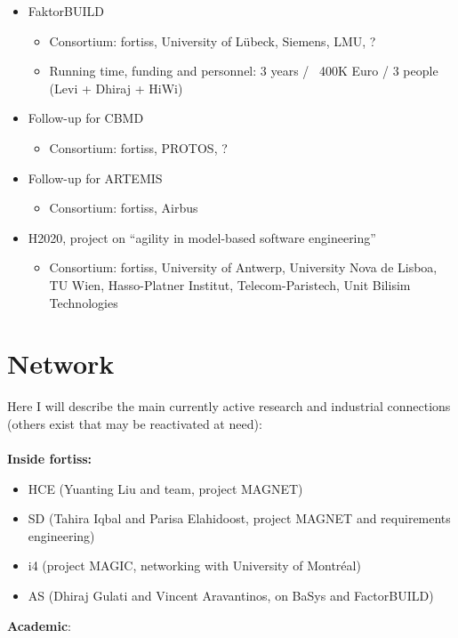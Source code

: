 \documentclass{article}
\begin{document}
\begin{appendices}
\begin{itemize}
  \item FaktorBUILD
    \begin{itemize}
    \item Consortium: fortiss, University of L\"ubeck, Siemens, LMU, ?
    \item Running time, funding and personnel: 3 years / ~400K Euro / 3 people
    (Levi + Dhiraj + HiWi)
  \end{itemize} 
  \item Follow-up for CBMD
    \begin{itemize}
    \item Consortium: fortiss, PROTOS, ?
  \end{itemize} 
  \item Follow-up for ARTEMIS
    \begin{itemize}
    \item Consortium: fortiss, Airbus
  \end{itemize} 
  \item H2020, project on ``agility in model-based software engineering''
    \begin{itemize}
    \item Consortium: fortiss, University of Antwerp, University Nova de Lisboa,
    TU Wien, Hasso-Platner Institut, Telecom-Paristech, Unit Bilisim
    Technologies
  \end{itemize} 
\end{itemize}

\section{Network}

Here I will describe the main currently active research and industrial
connections (others exist that may be reactivated at need):\\\\
\textbf{Inside fortiss:}

\begin{itemize}
  \item HCE (Yuanting Liu and team, project MAGNET)
  \item SD (Tahira Iqbal and Parisa Elahidoost, project MAGNET and requirements
  engineering)
  \item i4 (project MAGIC, networking with University of Montréal)
  \item AS (Dhiraj Gulati and Vincent Aravantinos, on BaSys and FactorBUILD)\\
\end{itemize}
\textbf{Academic}:


\end{appendices}
\end{document}
